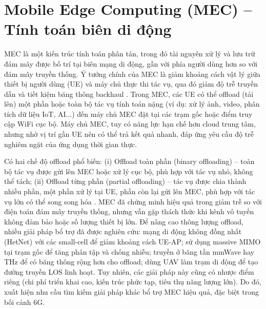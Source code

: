 \section{Mobile Edge Computing (MEC) – Tính toán biên di động}


MEC là một kiến trúc tính toán phân tán, trong đó tài nguyên xử lý và lưu trữ đám mây được bố trí tại biên mạng di động, gần với phía người dùng hơn so với đám mây truyền thống. Ý tưởng chính của MEC là giảm khoảng cách vật lý giữa thiết bị người dùng (UE) và máy chủ thực thi tác vụ, qua đó giảm độ trễ truyền dẫn và tiết kiệm băng thông backhaul \cite{ris_latency}. Trong MEC, các UE có thể offload (tải lên) một phần hoặc toàn bộ tác vụ tính toán nặng (ví dụ: xử lý ảnh, video, phân tích dữ liệu IoT, AI...) đến máy chủ MEC đặt tại các trạm gốc hoặc điểm truy cập WiFi cục bộ. Máy chủ MEC, tuy có năng lực hạn chế hơn cloud trung tâm, nhưng nhờ vị trí gần UE nên có thể trả kết quả nhanh, đáp ứng yêu cầu độ trễ nghiêm ngặt của ứng dụng thời gian thực. 


Có hai chế độ offload phổ biến: (i) Offload toàn phần (binary offloading) – toàn bộ tác vụ được gửi lên MEC hoặc xử lý cục bộ, phù hợp với tác vụ nhỏ, không thể tách; (ii) Offload từng phần (partial offloading) – tác vụ được chia thành nhiều phần, một phần xử lý tại UE, phần còn lại gửi lên MEC, phù hợp với tác vụ lớn có thể song song hóa \cite{ris_latency}. MEC đã chứng minh hiệu quả trong giảm trễ so với điện toán đám mây truyền thống, nhưng vẫn gặp thách thức khi kênh vô tuyến không đảm bảo hoặc số lượng thiết bị lớn. Để nâng cao thông lượng offload, nhiều giải pháp bổ trợ đã được nghiên cứu: mạng di động không đồng nhất (HetNet) với các small-cell để giảm khoảng cách UE-AP; sử dụng massive MIMO tại trạm gốc để tăng phân tập và chống nhiễu; truyền ở băng tần mmWave hay THz để có băng thông rộng hơn cho offload; dùng UAV làm trạm di động để tạo đường truyền LOS linh hoạt. Tuy nhiên, các giải pháp này cũng có nhược điểm riêng (chi phí triển khai cao, kiến trúc phức tạp, tiêu thụ năng lượng lớn). Do đó, xuất hiện nhu cầu tìm kiếm giải pháp khác bổ trợ MEC hiệu quả, đặc biệt trong bối cảnh 6G.